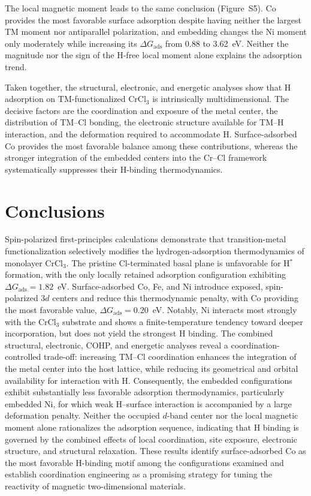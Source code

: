\documentclass[journal=jacsat,manuscript=article]{achemso}
\begin{document}
The local magnetic moment leads to the same conclusion (Figure~S5). Co provides the most favorable surface adsorption despite having neither the largest TM moment nor antiparallel polarization, and embedding changes the Ni moment only moderately while increasing its $\Delta G_{\mathrm{ads}}$ from 0.88 to 3.62~eV. Neither the magnitude nor the sign of the H-free local moment alone explains the adsorption trend.

Taken together, the structural, electronic, and energetic analyses show that H adsorption on TM-functionalized CrCl$_3$ is intrinsically multidimensional. The decisive factors are the coordination and exposure of the metal center, the distribution of TM--Cl bonding, the electronic structure available for TM--H interaction, and the deformation required to accommodate H. Surface-adsorbed Co provides the most favorable balance among these contributions, whereas the stronger integration of the embedded centers into the Cr--Cl framework systematically suppresses their H-binding thermodynamics.


\section{Conclusions}

Spin-polarized first-principles calculations demonstrate that transition-metal functionalization selectively modifies the hydrogen-adsorption thermodynamics of monolayer CrCl$_3$. The pristine Cl-terminated basal plane is unfavorable for H$^*$ formation, with the only locally retained adsorption configuration exhibiting $\Delta G_{\mathrm{ads}}=1.82$~eV. Surface-adsorbed Co, Fe, and Ni introduce exposed, spin-polarized $3d$ centers and reduce this thermodynamic penalty, with Co providing the most favorable value, $\Delta G_{\mathrm{ads}}=0.20$~eV. Notably, Ni interacts most strongly with the CrCl$_3$ substrate and shows a finite-temperature tendency toward deeper incorporation, but does not yield the strongest H binding. The combined structural, electronic, COHP, and energetic analyses reveal a coordination-controlled trade-off: increasing TM--Cl coordination enhances the integration of the metal center into the host lattice, while reducing its geometrical and orbital availability for interaction with H. Consequently, the embedded configurations exhibit substantially less favorable adsorption thermodynamics, particularly embedded Ni, for which weak H--surface interaction is accompanied by a large deformation penalty. Neither the occupied $d$-band center nor the local magnetic moment alone rationalizes the adsorption sequence, indicating that H binding is governed by the combined effects of local coordination, site exposure, electronic structure, and structural relaxation. These results identify surface-adsorbed Co as the most favorable H-binding motif among the configurations examined and establish coordination engineering as a promising strategy for tuning the reactivity of magnetic two-dimensional materials.
\end{document}

